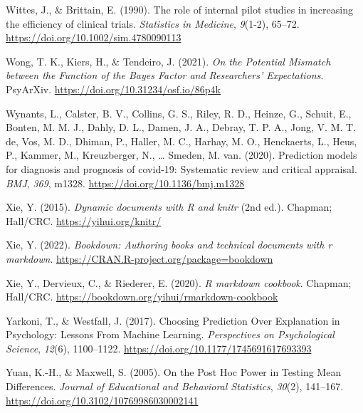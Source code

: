 \documentclass[
  oneside]{krantz}
\newlength{\cslhangindent}
\newlength{\cslentryspacingunit} %
\newenvironment{CSLReferences}[2] %
 {%
  \setlength{\parindent}{0pt}
  \ifodd #1
  \let\oldpar\par
  \def\par{\hangindent=\cslhangindent\oldpar}
  \fi
  \setlength{\parskip}{#2\cslentryspacingunit}
 }%
 {}
\begin{document}
\begin{CSLReferences}{1}{0}
\leavevmode{}%
Wittes, J., \& Brittain, E. (1990). The role of internal pilot studies
in increasing the efficiency of clinical trials. \emph{Statistics in
Medicine}, \emph{9}(1-2), 65--72.
\url{https://doi.org/10.1002/sim.4780090113}

\leavevmode{}%
Wong, T. K., Kiers, H., \& Tendeiro, J. (2021). \emph{On the {Potential
Mismatch} between the {Function} of the {Bayes Factor} and
{Researchers}' {Expectations}}. {PsyArXiv}.
\url{https://doi.org/10.31234/osf.io/86p4k}

\leavevmode{}%
Wynants, L., Calster, B. V., Collins, G. S., Riley, R. D., Heinze, G.,
Schuit, E., Bonten, M. M. J., Dahly, D. L., Damen, J. A., Debray, T. P.
A., Jong, V. M. T. de, Vos, M. D., Dhiman, P., Haller, M. C., Harhay, M.
O., Henckaerts, L., Heus, P., Kammer, M., Kreuzberger, N., \ldots{}
Smeden, M. van. (2020). Prediction models for diagnosis and prognosis of
covid-19: Systematic review and critical appraisal. \emph{BMJ},
\emph{369}, m1328. \url{https://doi.org/10.1136/bmj.m1328}

\leavevmode{}%
Xie, Y. (2015). \emph{Dynamic documents with {R} and knitr} (2nd ed.).
Chapman; Hall/CRC. \url{https://yihui.org/knitr/}

\leavevmode{}%
Xie, Y. (2022). \emph{Bookdown: Authoring books and technical documents
with r markdown}. \url{https://CRAN.R-project.org/package=bookdown}

\leavevmode{}%
Xie, Y., Dervieux, C., \& Riederer, E. (2020). \emph{R markdown
cookbook}. Chapman; Hall/CRC.
\url{https://bookdown.org/yihui/rmarkdown-cookbook}

\leavevmode{}%
Yarkoni, T., \& Westfall, J. (2017). Choosing {Prediction Over
Explanation} in {Psychology}: {Lessons From Machine Learning}.
\emph{Perspectives on Psychological Science}, \emph{12}(6), 1100--1122.
\url{https://doi.org/10.1177/1745691617693393}

\leavevmode{}%
Yuan, K.-H., \& Maxwell, S. (2005). On the {Post Hoc Power} in {Testing
Mean Differences}. \emph{Journal of Educational and Behavioral
Statistics}, \emph{30}(2), 141--167.
\url{https://doi.org/10.3102/10769986030002141}


\end{CSLReferences}
\end{document}
